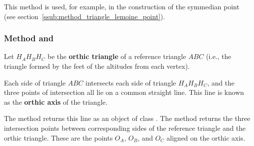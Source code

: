 \medskip
\noindent
This method is used, for example, in the construction of the symmedian point (see section~\ref{ssub:method_triangle_lemoine_point}).

\vspace{1em}
\begin{minipage}{.5\textwidth}
\end{minipage}
\begin{minipage}{.5\textwidth}
\begin{tkzexample}
\end{tkzexample}
\end{minipage}

\subsubsection{Method   and }
\label{ssub:method_triangle_orthic_axis}
\label{ssub:method_triangle_orthic_axis_points}

Let $H_AH_BH_C$ be the \textbf{orthic triangle} of a reference triangle $ABC$ (i.e., the triangle formed by the feet of the altitudes from each vertex).

\medskip
\noindent
Each side of triangle $ABC$ intersects each side of triangle $H_AH_BH_C$, and the three points of intersection all lie on a common straight line. This line is known as the \textbf{orthic axis} of the triangle.

\medskip
\noindent
The method  returns this line as an object of class .
The method  returns the three intersection points between corresponding sides of the reference triangle and the orthic triangle. These are the points $O_A$, $O_B$, and $O_C$ aligned on the orthic axis.

